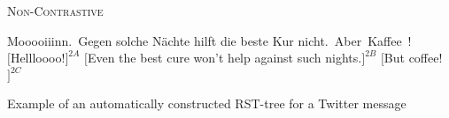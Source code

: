 {
\centering
\dirrel{}
        {}
        {\textsc{Non-Contrastive}}
        {
                {}
                {}
                {}}

\begin{flushleft}
\begin{rhetoricaltext}
\unit[1]{Mooooiiinn.}
\unit[2]{Gegen solche N\"achte hilft die beste Kur nicht.}
\unit[3]{Aber Kaffee!}
\\
$[$Hellloooo!$]^{2A}$ $[$Even the best cure won't help against such nights.$]^{2B}$ $[$But coffee!$]^{2C}$
\end{rhetoricaltext}
\end{flushleft}
\caption[Automatic RST tree for a tweet]{Example of an automatically constructed RST-tree for a Twitter message}\label{dasa:fig:twitter-rst-tree}
}
